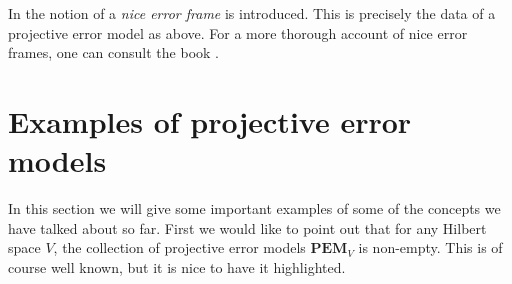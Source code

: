 \documentclass[11pt, oneside, reqno]{amsart}
\newcommand{\PEM}{\mathbf{PEM}}
\theoremstyle{definition}
\theoremstyle{plain}
\theoremstyle{remark}
\begin{document}
In \cite{ChienWaldron17} the notion of a \emph{nice error frame} is introduced. This is precisely the data of a projective error model as above. For a more thorough account of nice error frames, one can consult the book \cite{Waldron18}.

\section{Examples of projective error models} \label{sec:EM examples}

In this section we will give some important examples of some of the concepts we have talked about so far. First we would like to point out that for any Hilbert space $V$, the collection of projective error models $\PEM_V$ is non-empty. This is of course well known, but it is nice to have it highlighted.
\end{document}
